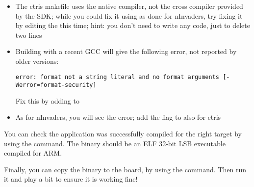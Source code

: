 \begin{itemize}
  \item The ctris makefile uses the native compiler, not the cross compiler
  provided by the SDK; while you could fix it using  as done
  for nInvaders, try fixing it by editing the  this time;
  hint: you don't need to write any code, just to delete two lines

  \item Building with a recent GCC will give the following error, not
  reported by older versions:
\begin{verbatim}
error: format not a string literal and no format arguments [-Werror=format-security]
\end{verbatim}
  Fix this by adding  to 

  \item As for nInvaders, you will see the 
  error; add the  flag to  also for ctris

\end{itemize}

You can check the application was successfully compiled for the right
target by using the  command.  The  binary should be
an ELF 32-bit LSB executable compiled for ARM.

Finally, you can copy the binary to the board, by using the 
command. Then run it and play a bit to ensure it is working fine!
